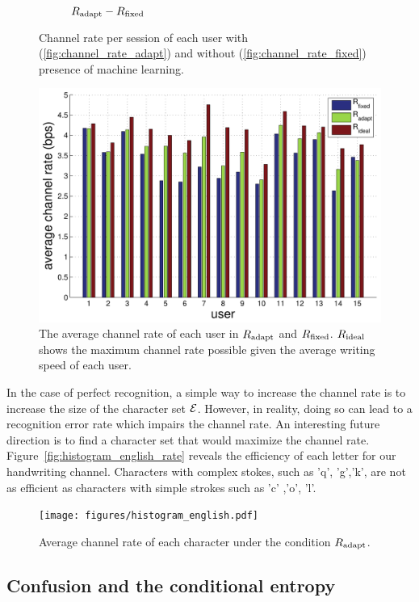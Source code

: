 \documentclass{sigchi}
\begin{document}
\begin{figure}
\begin{subfigure}[b]{\columnwidth}
    \caption{$R_{\mathrm{adapt}} - R_{\mathrm{fixed}}$}
    \label{fig:channel_rate_diff}
  \end{subfigure}
  \label{fig:channel_rate}
  \caption{Channel rate per session of each user with
    (\ref{fig:channel_rate_adapt}) and without (\ref{fig:channel_rate_fixed})
    presence of machine learning. }
\end{figure}

\begin{figure}
  \centering
  \includegraphics[width=.9\columnwidth]{figures/IUI_user_summary.pdf}   
  \caption{The average channel rate of each user in $R_{\mathrm{adapt}}$ and
    $R_{\mathrm{fixed}}$. $R_{\mathrm{ideal}}$ shows the maximum channel rate possible given the
    average writing speed of each user. }
  \label{fig:channel_rate_per_user}
\end{figure}

In the case of perfect recognition, a simple way to increase the
channel rate is to increase the size of the character set
$\mathcal{E}$. However, in reality, doing so can lead to a
recognition error rate which impairs the channel rate. An interesting
future direction is to find a character set that would maximize the channel
rate. Figure~\ref{fig:histogram_english_rate} reveals the efficiency of each
letter for our handwriting channel. Characters with complex stokes,
such as 'q', 'g','k', are not as efficient as characters with simple
strokes such as 'c' ,'o', 'l'. 

\begin{figure}
  \centering
  \texttt{[image: figures/histogram\_english.pdf]}
  \caption{Average channel rate of each character under the condition $R_{\mathrm{adapt}}$.}
  \label{fig:histogram_channel_rate} 
\end{figure}


\subsection{Confusion and the conditional entropy}
\end{document}
